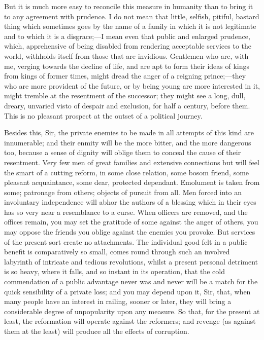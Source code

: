 But it is much more easy to reconcile this measure in humanity than to bring it to any agreement with prudence. I do not mean that little, selfish, pitiful, bastard thing which sometimes goes by the name of a family in which it is not legitimate and to which it is a disgrace;—I mean even that public and enlarged prudence, which, apprehensive of being disabled from rendering acceptable services to the world, withholds itself from those that are invidious. Gentlemen who are, with me, verging towards the decline of life, and are apt to form their ideas of kings from kings of former times, might dread the anger of a reigning prince;—they who are more provident of the future, or by being young are more interested in it, might tremble at the resentment of the successor; they might see a long, dull, dreary, unvaried visto of despair and exclusion, for half a century, before them. This is no pleasant prospect at the outset of a political journey.

Besides this, Sir, the private enemies to be made in all attempts of this kind are innumerable; and their enmity will be the more bitter, and the more dangerous too, because a sense of dignity will oblige them to conceal the cause of their resentment. Very few men of great families and extensive connections but will feel the smart of a cutting reform, in some close relation, some bosom friend, some pleasant acquaintance, some dear, protected dependant. Emolument is taken from some; patronage from others; objects of pursuit from all. Men forced into an involuntary independence will abhor the authors of a blessing which in their eyes has so very near a resemblance to a curse. When officers are removed, and the offices remain, you may set the gratitude of some against the anger of others, you may oppose the friends you oblige against the enemies you provoke. But services of the present sort create no attachments. The individual good felt in a public benefit is comparatively so small, comes round through such an involved labyrinth of intricate and tedious revolutions, whilst a present personal detriment is so heavy, where it falls, and so instant in its operation, that the cold commendation of a public advantage never was and never will be a match for the quick sensibility of a private loss; and you may depend upon it, Sir, that, when many people have an interest in railing, sooner or later, they will bring a considerable degree of unpopularity upon any measure. So that, for the present at least, the reformation will operate against the reformers; and revenge (as against them at the least) will produce all the effects of corruption.

